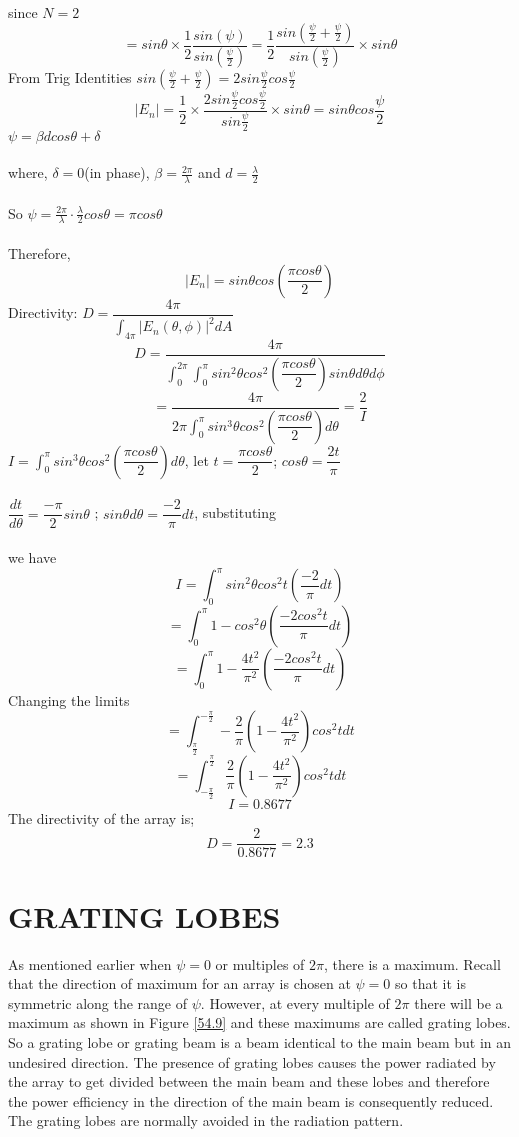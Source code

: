 since $N = 2$ \\
$$ = sin\theta \times \dfrac{1}{2} \dfrac{sin( \psi)}{sin(\frac{\psi}{2})} = \dfrac{1}{2} \dfrac{sin(\frac{\psi}{2}+ \frac{\psi}{2})}{sin(\frac{\psi}{2})} \times sin\theta $$ 
From Trig Identities $sin(\frac{\psi}{2}+ \frac{\psi}{2}) = 2sin\frac{\psi}{2}cos\frac{\psi}{2}$
$$ |E_{n}| = \dfrac{1}{2} \times \dfrac{2sin\frac{\psi}{2}cos\frac{\psi}{2}}{sin\frac{\psi}{2}}  \times sin\theta = sin\theta cos\frac{\psi}{2}	$$
$\psi = \beta dcos\theta +  \delta $ \\ \\
where, $\delta = 0$(in phase), $\beta = \frac{2\pi}{\lambda}$ and $ d = \frac{\lambda}{2} $ \\ \\
So $\psi = \frac{2\pi}{\lambda} \cdot \frac{\lambda}{2} cos\theta  = \pi cos\theta$ \\ \\
Therefore, $$|E_{n}| = sin\theta cos\left(\dfrac{\pi cos\theta}{2}\right) $$ 
Directivity: $ D = \dfrac{4\pi}{\int_{4\pi}|E_{n}(\theta, \phi)|^2 dA}$ 
$$ D = \dfrac{4\pi}{\int_{0}^{2\pi}\int_{0}^{\pi} sin^2\theta cos^2\left(\dfrac{\pi cos\theta}{2}\right)sin\theta d\theta d\phi}$$  $$ = \dfrac{4\pi}{ 2\pi \int_{0}^{\pi} sin^3\theta cos^2\left(\dfrac{\pi cos\theta}{2}\right) d\theta} = \dfrac{2}{I}$$
$ I = \int_{0}^{\pi} sin^3\theta cos^2\left(\dfrac{\pi cos\theta}{2}\right) d\theta $, 
let $t = \dfrac{\pi cos\theta}{2} $; $ cos\theta = \dfrac{2t}{\pi}$ \\ \\
$\dfrac{dt}{d\theta} = \dfrac{- \pi}{2} sin\theta $ ; $sin\theta d\theta = \dfrac{-2}{\pi}dt$, substituting\\ \\ we have
$$  I = \int_{0}^{\pi} sin^2\theta cos^2t\left(\dfrac{-2}{\pi}dt\right) $$
$$ = \int_{0}^{\pi} 1 - cos^2\theta \left(\dfrac{-2 cos^2 t}{\pi} dt\right) $$ 
$$  = \int_{0}^{\pi} 1 - \dfrac{4t^2}{\pi^2} \left(\dfrac{-2 cos^2 t}{\pi} dt\right)$$
Changing the limits
$$  = \int_{\frac{\pi}{2}}^{-\frac{\pi}{2}} -\dfrac{2}{\pi}\left(1 - \dfrac{4t^2}{\pi^2}\right) cos^2t dt$$
$$  = \int_{-\frac{\pi}{2}}^{\frac{\pi}{2}} \dfrac{2}{\pi}\left(1 - \dfrac{4t^2}{\pi^2}\right) cos^2t dt$$
$$ I = 0.8677 $$ 
The directivity of the array  is; 
$$ D = \dfrac{2}{0.8677} = 2.3 $$ 
\section{GRATING LOBES}
As mentioned earlier when $\psi = 0 $ or multiples of $2\pi$, there is a maximum. Recall that the direction of maximum for an array is chosen at $\psi = 0$ so that it is symmetric along the range of $\psi$. However, at every multiple of $2\pi$ there will be a maximum as shown in Figure \ref{54.9} and these maximums are called grating lobes. So a grating lobe or grating beam is a beam identical to the main beam but in an undesired direction. The presence of grating lobes causes the power radiated by the array to get divided between the main beam and these lobes and therefore the power efficiency in the direction of the main beam is consequently reduced. The grating lobes are normally avoided in the radiation pattern.

